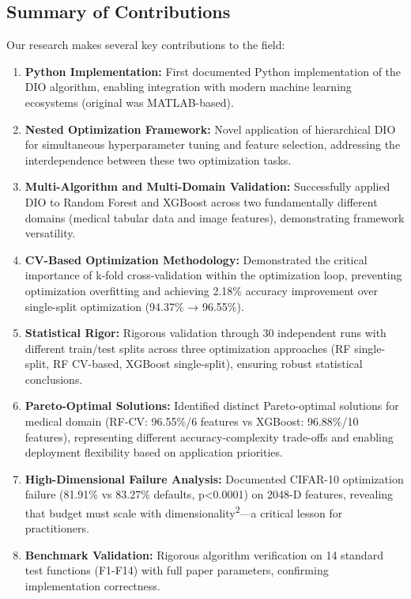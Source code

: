 \documentclass[12pt, a4paper]{article}
\begin{document}
\subsection{Summary of Contributions}
Our research makes several key contributions to the field:
\begin{enumerate}
    \item \textbf{Python Implementation:} First documented Python implementation of the DIO algorithm, enabling integration with modern machine learning ecosystems (original was MATLAB-based).
    \item \textbf{Nested Optimization Framework:} Novel application of hierarchical DIO for simultaneous hyperparameter tuning and feature selection, addressing the interdependence between these two optimization tasks.
    \item \textbf{Multi-Algorithm and Multi-Domain Validation:} Successfully applied DIO to Random Forest and XGBoost across two fundamentally different domains (medical tabular data and image features), demonstrating framework versatility.
    \item \textbf{CV-Based Optimization Methodology:} Demonstrated the critical importance of k-fold cross-validation within the optimization loop, preventing optimization overfitting and achieving 2.18\% accuracy improvement over single-split optimization (94.37\% → 96.55\%).
    \item \textbf{Statistical Rigor:} Rigorous validation through 30 independent runs with different train/test splits across three optimization approaches (RF single-split, RF CV-based, XGBoost single-split), ensuring robust statistical conclusions.
    \item \textbf{Pareto-Optimal Solutions:} Identified distinct Pareto-optimal solutions for medical domain (RF-CV: 96.55\%/6 features vs XGBoost: 96.88\%/10 features), representing different accuracy-complexity trade-offs and enabling deployment flexibility based on application priorities.
    \item \textbf{High-Dimensional Failure Analysis:} Documented CIFAR-10 optimization failure (81.91\% vs 83.27\% defaults, p<0.0001) on 2048-D features, revealing that budget must scale with dimensionality\textsuperscript{2}—a critical lesson for practitioners.
    \item \textbf{Benchmark Validation:} Rigorous algorithm verification on 14 standard test functions (F1-F14) with full paper parameters, confirming implementation correctness.
\end{enumerate}
\end{document}

